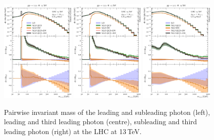 \begin{figure}[t!]
  \centering
  \includegraphics[width=0.32\textwidth]{figs_aaa/m_y1y2_comb_log}
  \includegraphics[width=0.32\textwidth]{figs_aaa/m_y1y3_comb_log}
  \includegraphics[width=0.32\textwidth]{figs_aaa/m_y2y3_comb_log}
  \caption{
    Pairwise invariant mass of the leading and subleading photon (left),
    leading and third leading photon (centre), subleading and third leading 
    photon (right) at the LHC at 13\,TeV.\\
    \label{fig:aaa:myy}
  }
\end{figure}

